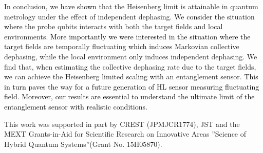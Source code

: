 \documentclass[prl,twocolumn,superscriptaddress]{revtex4}
\begin{document}
In conclusion, we \textcolor{black}{have shown} that
the 
Heisenberg limit is attainable in
quantum metrology under the effect of independent dephasing.
We \textcolor{black}{consider the situation where the}
probe qubits interacts with both the target fields and
local environments. \textcolor{black}{More importantly we were interested in the situation where the}
target fields are temporally fluctuating
\textcolor{black}{which induces}
 Markovian collective dephasing, while the local environment
 \textcolor{black}{only} induces
 independent dephasing. We find that,
 \textcolor{black}{when estimating}
 the collective
 dephasing rate due to the target fields, we can achieve the Heisenberg
 limited \textcolor{black}{scaling} with an entanglement sensor.
 \textcolor{black}{This in turn paves the way for a future generation of
 HL sensor measuring fluctuating field.}
\textcolor{black}{Moreover, our results are essential to understand the
ultimate limit of the entanglement sensor with realistic conditions.}


This work was supported
in part by CREST (JPMJCR1774), JST and
the MEXT Grants-in-Aid for Scientific Research on Innovative Areas ''Science of
Hybrid Quantum Systems''(Grant No. 15H05870).
\end{document}
